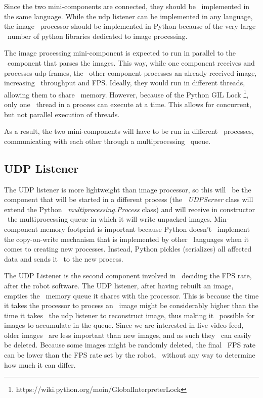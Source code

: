 Since the two mini-components are connected, they should be \
implemented in the same language.
While the udp listener can be implemented in any language, the image \
processor should be implemented in Python because of the very large \
number of python libraries dedicated to image processing.

The image processing mini-component is expected to run in parallel to the \
component that parses the images.
This way, while one component receives and processes udp frames, the \
other component processes an already received image, increasing \
throughput and FPS.
Ideally, they would run in different threads, allowing them to share \
memory.
However, because of the Python GIL Lock
\footnote{https://wiki.python.org/moin/GlobalInterpreterLock}, only one \
thread in a process can execute at a time.
This allows for concurrent, but not parallel execution of threads.

As a result, the two mini-components will have to be run in different \
processes, communicating with each other through a multiprocessing \
queue.

\subsection{UDP Listener}
\label{subsec:implementation-udp-listener}
The UDP listener is more lightweight than image processor, so this will \
be the component that will be started in a different process (the \
\textit{UDPServer} class will extend the Python \
\textit{multiprocessing.Process} class) and will receive in constructor \
the multiprocessing queue in which it will write unpacked images.
Min-component memory footprint is important because Python doesn't \
implement the copy-on-write mechanism that is implemented by other \
languages when it comes to creating new processes.
Instead, Python pickles (serializes) all affected data and sends it \
to the new process.

The UDP Listener is the second component involved in \
deciding the FPS rate, after the robot software.
The UDP listener, after having rebuilt an image, empties the \
memory queue it shares with the processor.
This is because the time it takes the processor to process an \
image might be considerably higher than the time it takes \
the udp listener to reconstruct image, thus making it \
possible for images to accumulate in the queue.
Since we are interested in live video feed, older images \
are less important than new images, and as such they \
can easily be deleted.
Because some images might be randomly deleted, the final \
FPS rate can be lower than the FPS rate set by the robot, \
without any way to determine how much it can differ.

